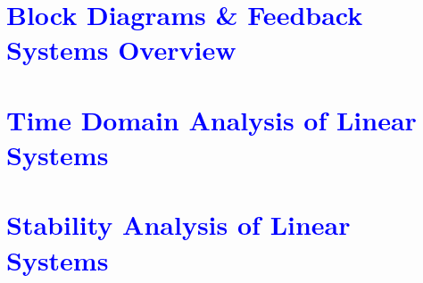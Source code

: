 \documentclass[a4paper,12pt]{report}
\begin{document}
\clearpage

\chapter{\textcolor{blue}{Block Diagrams \& Feedback Systems Overview}}

\clearpage

\chapter{\textcolor{blue}{Time Domain Analysis of Linear Systems}}
\clearpage

\chapter{\textcolor{blue}{Stability Analysis of Linear Systems}}
\end{document}

